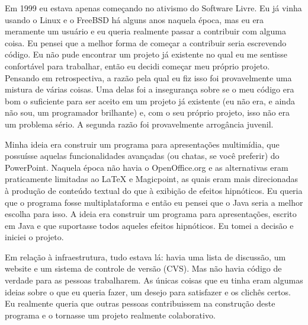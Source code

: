 

\noindent{}Em 1999 eu estava apenas começando no ativismo do Software Livre.
Eu já vinha usando o Linux e o FreeBSD há alguns anos naquela época, mas
eu era meramente um usuário e eu queria realmente passar a contribuir com
alguma coisa. Eu pensei que a melhor forma de começar a contribuir seria escrevendo
código. Eu não pude encontrar um projeto já existente no qual eu me sentisse
confortável para trabalhar, então eu decidi começar meu próprio projeto. Pensando
em retrospectiva, a razão pela qual eu fiz isso foi provavelmente uma mistura de
várias coisas. Uma delas foi a insegurança sobre se o meu código era bom o
suficiente para ser aceito em um projeto já existente (eu não era, e ainda não
sou, um programador brilhante) e, com o seu próprio projeto, isso não era um
problema sério. A segunda razão foi provavelmente arrogância juvenil.

Minha ideia era construir um programa para apresentações multimídia, que possuísse
aquelas funcionalidades avançadas (ou chatas, se você preferir) do PowerPoint.
Naquela época não havia o OpenOffice.org e as alternativas eram praticamente
limitadas ao LaTeX e Magicpoint, as quais eram mais direcionadas à produção de
conteúdo textual do que à exibição de efeitos hipnóticos. Eu queria que o programa
fosse multiplataforma e então eu pensei que o Java seria a melhor escolha para isso.
A ideia era construir um programa para apresentações, escrito em Java e que suportasse
todos aqueles efeitos hipnóticos. Eu tomei a decisão e iniciei o projeto.

Em relação à infraestrutura, tudo estava lá: havia uma lista de discussão,
um website e um sistema de controle de versão (CVS). Mas não havia código de verdade
para as pessoas trabalharem. As únicas coisas que eu tinha eram algumas ideias sobre o
que eu queria fazer, um desejo para satisfazer e os clichês certos. Eu realmente
queria que outras pessoas contribuissem na construção deste programa e o tornasse um
projeto realmente colaborativo.

